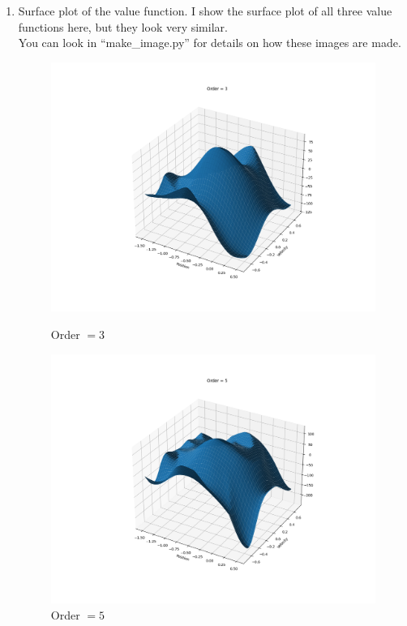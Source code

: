 \documentclass{article}
\begin{document}
\begin{enumerate}
\item Surface plot of the value function. 
    I show the surface plot of all three value functions here, but they look very similar. \\
    You can look in ``make\_image.py'' for details on how these images are made.  
    \begin{figure}[h]
        \centerline{\includegraphics[width=\linewidth]{images/surfaceOrder3.png}}
            \caption{Order $ = 3 $ }
        \endminipage
        \centerline{\includegraphics[width=\linewidth]{images/surfaceOrder5.png}}
            \caption{Order $ = 5 $ }
        \endminipage\hfill

\end{figure}
\end{enumerate}
\end{document}
